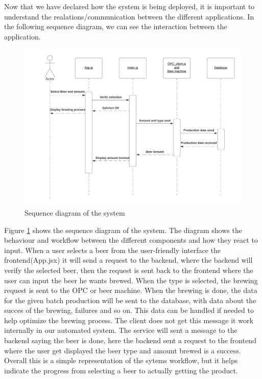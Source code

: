 Now that we have declared how the system is being deployed, it is important to understand the realations/communication between the different applications. In the following sequence diagram, we can see the interaction between the application.

\begin{center}
    \centering
    \begin{figure}[H]
        \includegraphics[width=1\textwidth]{img/SQdiagram_implementation.png}
        \caption{Sequence diagram of the system}
        \label{fig:SQdiagram_implementation}
    \end{figure}
\end{center}

Figure \ref{fig:SQdiagram_implementation} shows the sequence diagram of the system. The diagram shows the behaviour and workflow between the different components and how they react to input. When a user selects a beer from the user-friendly interface the frontend(App.jsx) it will send a request to the backend, where the backend will verify the selected beer, then the request is sent back to the frontend where the user can input the beer he wants brewed. When the type is selected, the brewing request is sent to the OPC or beer machine.
When the brewing is done, the data for the given batch production will be sent to the database, with data about the succes of the brewing, failures and so on. This data can be handled if needed to help optimize the brewing process. The client does not get this message it work internally in our automated system. The service will sent a message to the backend saying the beer is done, here the backend sent a request to the frontend where the user get displayed the beer type and amount brewed is a success.
Overall this is a simple representation of the sytems workflow, but it helps indicate the progress from selecting a beer to actually getting the product.


